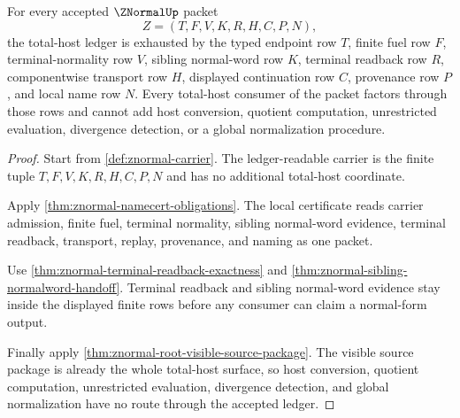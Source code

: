 \begin{theorem}
\label{thm:znormal-total-host-ledger-exhaustion}
For every accepted $\ZNormalUp$ packet
$$
Z=(T,F,V,K,R,H,C,P,N),
$$
the total-host ledger is exhausted by the typed endpoint row $T$, finite fuel
row $F$, terminal-normality row $V$, sibling normal-word row $K$, terminal
readback row $R$, componentwise transport row $H$, displayed continuation row
$C$, provenance row $P$, and local name row $N$. Every total-host consumer of
the packet factors through those rows and cannot add host conversion, quotient
computation, unrestricted evaluation, divergence detection, or a global
normalization procedure.
\end{theorem}
\begin{proof}
Start from \autoref{def:znormal-carrier}. The ledger-readable carrier is the
finite tuple $T,F,V,K,R,H,C,P,N$ and has no additional total-host coordinate.

Apply \autoref{thm:znormal-namecert-obligations}. The local certificate reads
carrier admission, finite fuel, terminal normality, sibling normal-word
evidence, terminal readback, transport, replay, provenance, and naming as one
packet.

Use \autoref{thm:znormal-terminal-readback-exactness} and
\autoref{thm:znormal-sibling-normalword-handoff}. Terminal readback and
sibling normal-word evidence stay inside the displayed finite rows before any
consumer can claim a normal-form output.

Finally apply \autoref{thm:znormal-root-visible-source-package}. The visible
source package is already the whole total-host surface, so host conversion,
quotient computation, unrestricted evaluation, divergence detection, and
global normalization have no route through the accepted ledger.
\end{proof}

